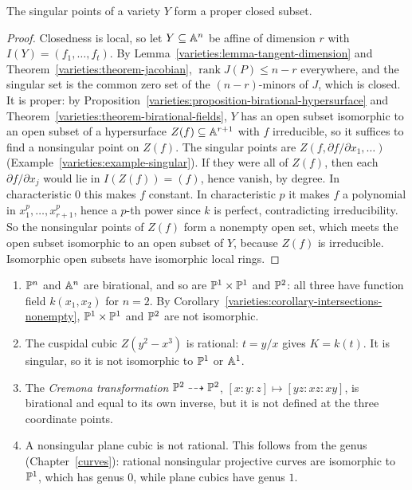\begin{theorem}\label{varieties:theorem-singular-locus}
The singular points of a variety $Y$ form a proper closed subset.
\end{theorem}

\begin{proof}
Closedness is local, so let $Y \subseteq \mathbb{A}^n$ be affine of dimension $r$ with $I(Y) = (f_1, \ldots, f_t)$. By
Lemma~\ref{varieties:lemma-tangent-dimension} and Theorem~\ref{varieties:theorem-jacobian}, $\operatorname{rank}J(P) \leq n - r$ everywhere, and the
singular set is the common zero set of the $(n - r)$-minors of $J$, which is closed. It is proper: by
Proposition~\ref{varieties:proposition-birational-hypersurface} and Theorem~\ref{varieties:theorem-birational-fields}, $Y$ has an open subset
isomorphic to an open subset of a hypersurface $Z(f) \subseteq \mathbb{A}^{r+1}$ with $f$ irreducible, so it suffices to find a nonsingular point on $Z(f)$.
The singular points are $Z(f, \partial f/\partial x_1, \ldots)$ (Example~\ref{varieties:example-singular}). If they were all of $Z(f)$, then each
$\partial f/\partial x_j$ would lie in $I(Z(f)) = (f)$, hence vanish, by degree. In characteristic $0$ this makes $f$ constant. In
characteristic $p$ it makes $f$ a polynomial in $x_1^p, \ldots, x_{r+1}^p$, hence a $p$-th power since $k$ is perfect, contradicting
irreducibility. So the nonsingular points of $Z(f)$ form a nonempty open set, which meets the open subset isomorphic to an open subset of $Y$,
because $Z(f)$ is irreducible. Isomorphic open subsets have isomorphic local rings.
\end{proof}

\begin{example}\label{varieties:example-birational}
\begin{enumerate}
\item $\mathbb{P}^n$ and $\mathbb{A}^n$ are birational, and so are $\mathbb{P}^1 \times \mathbb{P}^1$ and $\mathbb{P}^2$: all three have function field $k(x_1, x_2)$ for $n = 2$. By
Corollary~\ref{varieties:corollary-intersections-nonempty}, $\mathbb{P}^1 \times \mathbb{P}^1$ and $\mathbb{P}^2$ are not isomorphic.
\item The cuspidal cubic $Z(y^2 - x^3)$ is rational: $t = y/x$ gives $K = k(t)$. It is singular, so it is not isomorphic to $\mathbb{P}^1$ or $\mathbb{A}^1$.
\item The \emph{Cremona transformation} $\mathbb{P}^2 \dashrightarrow \mathbb{P}^2$, $[x : y : z] \mapsto [yz : xz : xy]$, is birational and equal to its own
inverse, but it is not defined at the three coordinate points.
\item A nonsingular plane cubic is not rational. This follows from the genus (Chapter~\ref{curves}): rational nonsingular projective curves are
isomorphic to $\mathbb{P}^1$, which has genus $0$, while plane cubics have genus $1$.
\end{enumerate}
\end{example}

